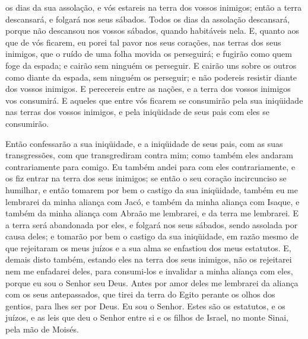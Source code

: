os dias da sua assolação, e vós estareis na terra dos vossos
inimigos; então a terra descansará, e folgará nos seus sábados.
Todos os dias da assolação descansará, porque não descansou
nos vossos sábados, quando habitáveis nela. E, quanto aos que
de vós ficarem, eu porei tal pavor nos seus corações, nas terras dos
seus inimigos, que o ruído de uma folha movida os perseguirá; e
fugirão como quem foge da espada; e cairão sem ninguém os perseguir.
E cairão uns sobre os outros como diante da espada, sem
ninguém os perseguir; e não podereis resistir diante dos vossos
inimigos. E perecereis entre as nações, e a terra dos vossos
inimigos vos consumirá. E aqueles que entre vós ficarem se
consumirão pela sua iniqüidade nas terras dos vossos inimigos, e
pela iniqüidade de seus pais com eles se consumirão.

Então confessarão a sua iniqüidade, e a iniqüidade de seus pais,
com as suas transgressões, com que transgrediram contra mim; como
também eles andaram contrariamente para comigo. Eu também
andei para com eles contrariamente, e os fiz entrar na terra dos
seus inimigos; se então o seu coração incircunciso se humilhar, e
então tomarem por bem o castigo da sua iniqüidade, também eu
me lembrarei da minha aliança com Jacó, e também da minha aliança
com Isaque, e também da minha aliança com Abraão me lembrarei, e da
terra me lembrarei. E a terra será abandonada por eles, e
folgará nos seus sábados, sendo assolada por causa deles; e tomarão
por bem o castigo da sua iniqüidade, em razão mesmo de que
rejeitaram os meus juízos e a sua alma se enfastiou dos meus
estatutos. E, demais disto também, estando eles na terra dos
seus inimigos, não os rejeitarei nem me enfadarei deles, para
consumi-los e invalidar a minha aliança com eles, porque eu sou o
Senhor seu Deus. Antes por amor deles me lembrarei da aliança
com os seus antepassados, que tirei da terra do Egito perante os
olhos dos gentios, para lhes ser por Deus. Eu sou o Senhor.
Estes são os estatutos, e os juízos, e as leis que deu o
Senhor entre si e os filhos de Israel, no monte Sinai, pela mão de
Moisés.

\medskip

